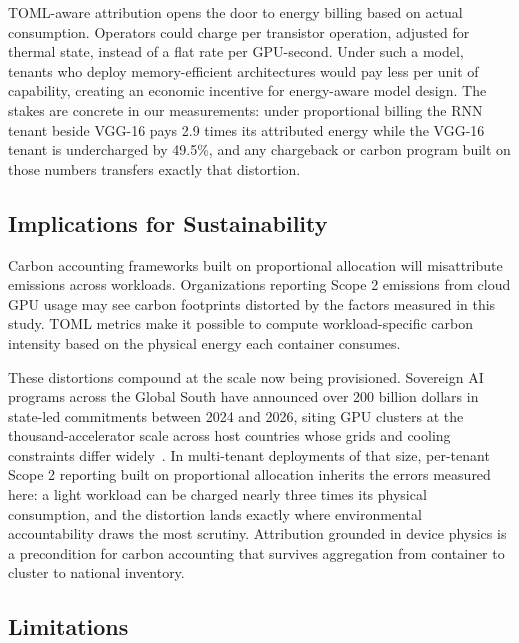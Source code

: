 \documentclass[conference]{IEEEtran}
\begin{document}
TOML-aware attribution opens the door to energy billing based on actual consumption. Operators could charge per transistor operation, adjusted for thermal state, instead of a flat rate per GPU-second. Under such a model, tenants who deploy memory-efficient architectures would pay less per unit of capability, creating an economic incentive for energy-aware model design. The stakes are concrete in our measurements: under proportional billing the RNN tenant beside VGG-16 pays 2.9 times its attributed energy while the VGG-16 tenant is undercharged by 49.5\%, and any chargeback or carbon program built on those numbers transfers exactly that distortion.

\subsection{Implications for Sustainability}

Carbon accounting frameworks built on proportional allocation will misattribute emissions across workloads. Organizations reporting Scope 2 emissions from cloud GPU usage may see carbon footprints distorted by the factors measured in this study. TOML metrics make it possible to compute workload-specific carbon intensity based on the physical energy each container consumes.

These distortions compound at the scale now being provisioned. Sovereign AI programs across the Global South have announced over 200 billion dollars in state-led commitments between 2024 and 2026, siting GPU clusters at the thousand-accelerator scale across host countries whose grids and cooling constraints differ widely~\cite{syed2026sovereign}. In multi-tenant deployments of that size, per-tenant Scope 2 reporting built on proportional allocation inherits the errors measured here: a light workload can be charged nearly three times its physical consumption, and the distortion lands exactly where environmental accountability draws the most scrutiny. Attribution grounded in device physics is a precondition for carbon accounting that survives aggregation from container to cluster to national inventory.

\subsection{Limitations}
\end{document}
